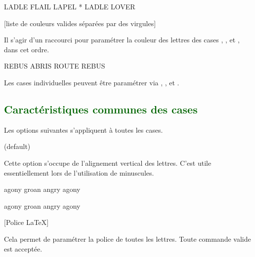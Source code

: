 \documentclass[svgnames]{report}
\newcommand\Section[1]{\subsection{\textcolor{DarkGreen}{#1}}}
\begin{document}
  \begin{example}
  \begin{wordle}[Formes={diamond,ellipse,star}]{LADLE}
     FLAIL
     LAPEL
     *
     LADLE
     LOVER
  \end{wordle}
  \end{example}

  [liste de couleurs valides séparées par des virgules]

  Il s'agir d'un raccourci pour paramétrer la couleur des lettres des cases   , ,  et , dans cet ordre.

  \begin{example}
  \begin{wordle}[CouleurLettres={red,orange,blue}]{REBUS}
    ABRIS
    ROUTE
    REBUS
  \end{wordle}
  \end{example}

  Les cases individuelles peuvent être paramétrer via , ,  et .


  \Section{Caractéristiques communes des cases}

  Les options suivantes s'appliquent à toutes les cases.

   (default) \qquad

  Cette option s'occupe de l'alignement vertical des lettres. C'est utile essentiellement lors de l'utilisation de minuscules.

  \begin{example}
  \begin{wordle}[align]{agony}
     groan
     angry
     agony
  \end{wordle}
  \end{example}

  \begin{example}
  \begin{wordle}{agony} %
    groan
    angry
    agony
  \end{wordle}
  \end{example}

       [Police \LaTeX]

  Cela permet de paramétrer la police de toutes les lettres. Toute commande valide est acceptée.
\end{document}
